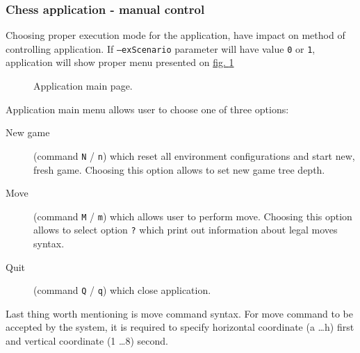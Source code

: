 \subsubsection{Chess application - manual control}
Choosing proper execution mode for the application, have impact on method of controlling application. If \texttt{--exScenario} parameter will have value \texttt{0} or \texttt{1}, application will show proper menu presented on \hyperref[fig:application-main-page]{fig. \ref*{fig:application-main-page}}
\begin{figure}
    \centering
    \begin{mdframed}
    \end{mdframed}
    \caption{Application main page.}
    \label{fig:application-main-page}
\end{figure}
Application main menu allows user to choose one of three options:
\begin{description}
    \item[New game] (command \texttt{N} / \texttt{n}) which reset all environment configurations and start new, fresh game. Choosing this option allows to set new game tree depth.
    \item[Move] (command \texttt{M} / \texttt{m}) which allows user to perform move. Choosing this option allows to select option \texttt{?} which print out information about legal moves syntax.
    \item[Quit] (command \texttt{Q} / \texttt{q}) which close application.
\end{description}
Last thing worth mentioning is move command syntax. For move command to be accepted by the system, it is required to specify horizontal coordinate (a \dots h) first and vertical coordinate (1 \dots 8) second.
